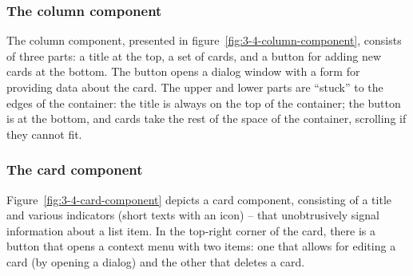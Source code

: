 \subsubsection{The column component}
The column component, presented in figure~\ref{fig:3-4-column-component}, consists of three parts: a title at the top, a set of cards, and a button for adding new cards at the bottom.
The button opens a dialog window with a form for providing data about the card.
The upper and lower parts are \enquote{stuck} to the edges of the container: the title is always on the top of the container;
the button is at the bottom, and cards take the rest of the space of the container, scrolling if they cannot fit.

\subsubsection{The card component}
Figure~\ref{fig:3-4-card-component} depicts a card component, consisting of a title and various indicators (short texts with an icon) -- that unobtrusively signal information about a list item.
In the top-right corner of the card, there is a button that opens a context menu with two items: one that allows for editing a card (by opening a dialog) and the other that deletes a card.

